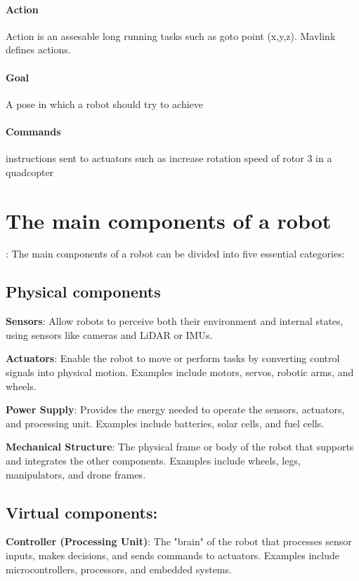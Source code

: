     \paragraph{Action}
        Action is an assesable long running tasks such as goto point (x,y,z). Mavlink defines actions.
    \paragraph{Goal}
        A pose in which a robot should try to achieve
    \paragraph{Commands}
        instructions sent to actuators such as increase rotation speed of rotor 3 in a quadcopter

\section{The main components of a robot}:
The main components of a robot can be divided into five essential categories:

    \subsection{Physical components}
        \textbf{Sensors}: Allow robots to perceive both their environment and internal states, using sensors like cameras and LiDAR or IMUs.

        \textbf{Actuators}: Enable the robot to move or perform tasks by converting control signals into physical motion.
        Examples include motors, servos, robotic arms, and wheels.

        \textbf{Power Supply}: Provides the energy needed to operate the sensors, actuators, and processing unit.
        Examples include batteries, solar cells, and fuel cells.

        \textbf{Mechanical Structure}: The physical frame or body of the robot that supports and integrates the other components.
        Examples include wheels, legs, manipulators, and drone frames.

    \subsection{Virtual components:}
        \textbf{Controller (Processing Unit)}: The "brain" of the robot that processes sensor inputs, makes decisions, and sends commands to actuators.
        Examples include microcontrollers, processors, and embedded systems.

